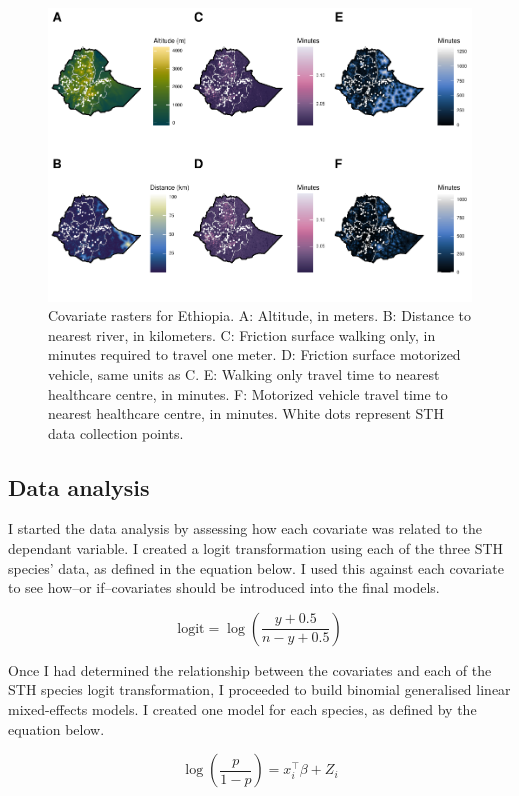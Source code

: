 \documentclass[
]{article}
\begin{document}
\begin{figure}
\centering
\includegraphics{write_up_files/figure-latex/covariates_figure-1.pdf}
\caption{Covariate rasters for Ethiopia. A: Altitude, in meters. B:
Distance to nearest river, in kilometers. C: Friction surface walking
only, in minutes required to travel one meter. D: Friction surface
motorized vehicle, same units as C. E: Walking only travel time to
nearest healthcare centre, in minutes. F: Motorized vehicle travel time
to nearest healthcare centre, in minutes. White dots represent STH data
collection points.}
\end{figure}

\hypertarget{data-analysis}{%
\subsection{Data analysis}\label{data-analysis}}

I started the data analysis by assessing how each covariate was related
to the dependant variable. I created a logit transformation using each
of the three STH species' data, as defined in the equation below. I used
this against each covariate to see how--or if--covariates should be
introduced into the final models.

\[ \text{logit} = \log\left(\frac{y+0.5}{n-y+0.5}\right) \]

Once I had determined the relationship between the covariates and each
of the STH species logit transformation, I proceeded to build binomial
generalised linear mixed-effects models. I created one model for each
species, as defined by the equation below.

\[ \log\left(\frac{p}{1-p}\right) = x_i^\intercal\beta + Z_i \]
\end{document}

